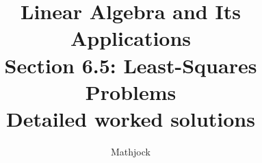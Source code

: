
\title{\textbf{Linear Algebra and Its Applications}\\[0.3em]Section 6.5: Least-Squares Problems\\[0.3em]\large Detailed worked solutions}
\author{Mathjock}
\date{}

\maketitle
\bookinfo
\tableofcontents
\clearpage
\renewcommand{\thesection}{6.\arabic{section}}
\renewcommand{\theHsection}{6.\arabic{section}}
\setcounter{section}{4}


